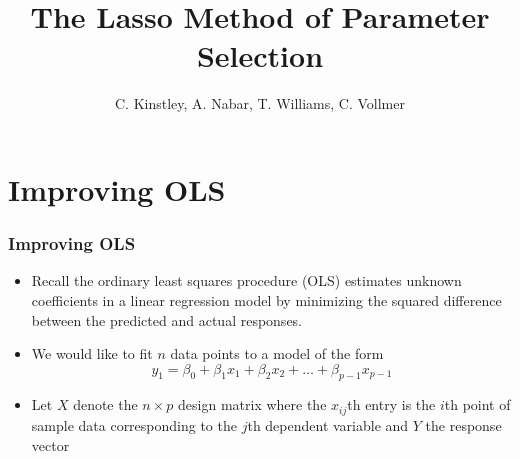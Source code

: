 \documentclass{beamer}
\begin{document}
\title{The Lasso Method of Parameter Selection}
\author{C. Kinstley, A. Nabar, T. Williams, C. Vollmer }
\frame{\titlepage}

\section[Outline]{}

\section{Improving OLS}


\frame
{
\frametitle{Improving OLS}
	\begin{itemize}
	\item Recall the ordinary least squares procedure (OLS) estimates unknown coefficients in a linear regression model by minimizing the {\color{red}squared difference} between the {\color{purple}predicted} and {\color{blue}actual} responses. 
	
	\item We would like to fit $n$ data points to a model of the form {\color{purple}$$y_1= \beta_0 + \beta_1 x_1 + \beta_2 x_2+ \dots +\beta_{p-1} x_{p-1}$$}
	
	\item Let $X$ denote the $n \times p$ design matrix where the $x_{ij}$th entry is the $i$th point of sample data corresponding to the $j$th dependent variable and $Y$ the response vector
		

	\end{itemize}
}
\end{document}
